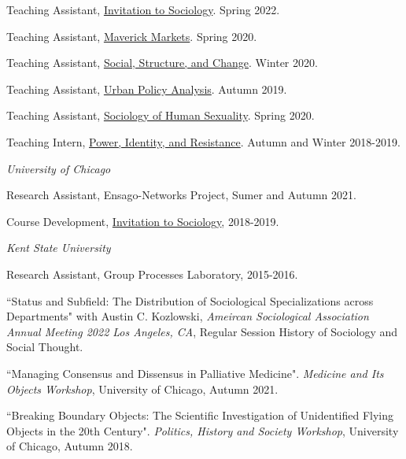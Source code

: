 \documentclass[11pt,article,oneside]{memoir}
\begin{document}
\ind Teaching Assistant, \underline{Invitation to Sociology}. Spring 2022.

\ind Teaching Assistant, \underline{Maverick Markets}. Spring 2020.

\ind Teaching Assistant, \underline{Social, Structure, and Change}. Winter 2020.

\ind Teaching Assistant, \underline{Urban Policy Analysis}. Autumn 2019.

\ind Teaching Assistant, \underline{Sociology of Human Sexuality}. Spring 2020.

\ind Teaching Intern, \underline{Power, Identity, and Resistance}. Autumn and Winter 2018-2019.

\bigskip

\medskip
\noindent\emph{University of Chicago \vspace{0.01in}}

\ind Research Assistant, Ensago-Networks Project, Sumer and Autumn 2021. \vspace{0.05in}

\ind Course Development, \underline{Invitation to Sociology}, 2018-2019. \vspace{0.05in}

\smallskip
\noindent\emph{Kent State University \vspace{0.01in}}

\ind Research Assistant, Group Processes Laboratory, 2015-2016. \vspace{0.1in}

\normalsize

\bigskip

\medskip

\ind ``Status and Subfield: The Distribution of Sociological Specializations across Departments" with Austin C. Kozlowski, \emph{Ameircan Sociological Association Annual Meeting 2022 Los Angeles, CA}, Regular Session History of Sociology and Social Thought. \vspace{0.001in}

\ind ``Managing Consensus and Dissensus in Palliative Medicine". \emph{Medicine and Its Objects Workshop}, University of Chicago, Autumn 2021. \vspace{0.05in}

\ind ``Breaking Boundary Objects: The Scientific Investigation of Unidentified Flying Objects in the 20th Century". \emph{Politics, History and Society Workshop}, University of Chicago,  Autumn 2018. \vspace{0.05in}
\end{document}
